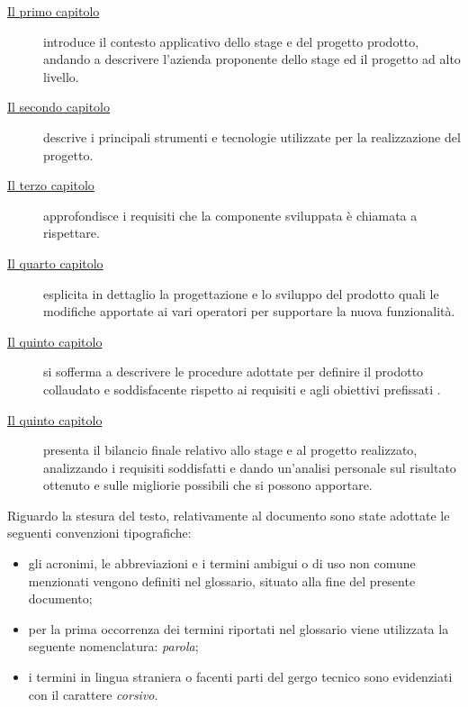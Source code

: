 \begin{description}
	\item[{\hyperref[cap:introduzione]{Il primo capitolo}}] introduce il contesto applicativo dello stage e del progetto prodotto, andando a descrivere l'azienda proponente dello stage ed il progetto ad alto livello.
 
    \item[{\hyperref[cap:strumenti-tecnologie]{Il secondo capitolo}}] descrive i principali strumenti e tecnologie utilizzate per la realizzazione del progetto.
    
    \item[{\hyperref[cap:analisi-requisiti]{Il terzo capitolo}}] approfondisce i requisiti che la componente sviluppata è chiamata a rispettare.
    
    \item[{\hyperref[cap:progettazione-codifica]{Il quarto capitolo}}] esplicita in dettaglio la progettazione e lo sviluppo del prodotto quali le modifiche apportate ai vari operatori per supportare la nuova funzionalità.
    
    \item[{\hyperref[cap:verifica-validazione]{Il quinto capitolo}}] si sofferma a descrivere le procedure adottate per definire il prodotto collaudato e soddisfacente rispetto ai requisiti e agli obiettivi prefissati .
    
    \item[{\hyperref[cap:conclusioni]{Il quinto capitolo}}] presenta il bilancio finale relativo allo stage e al progetto realizzato, analizzando i requisiti soddisfatti e dando un'analisi personale sul risultato ottenuto e sulle migliorie possibili che si possono apportare.
\end{description}

Riguardo la stesura del testo, relativamente al documento sono state adottate le seguenti convenzioni tipografiche:
\begin{itemize}
	\item gli acronimi, le abbreviazioni e i termini ambigui o di uso non comune menzionati vengono definiti nel glossario, situato alla fine del presente documento;
	\item per la prima occorrenza dei termini riportati nel glossario viene utilizzata la seguente nomenclatura: \emph{parola}\glsfirstoccur;
	\item i termini in lingua straniera o facenti parti del gergo tecnico sono evidenziati con il carattere \emph{corsivo}.
\end{itemize}
